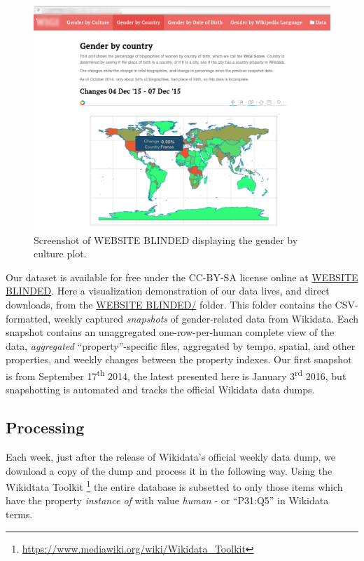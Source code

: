 \documentclass[letterpaper]{article}
\begin{document}
\begin{figure}
\label{fig:screenshot}
\includegraphics[scale=0.2]{figures/website_screenshot.png} 
\caption{Screenshot of WEBSITE BLINDED displaying the gender by culture plot.}
\end{figure}

Our dataset is available for free under the CC-BY-SA license online at  \url{WEBSITE BLINDED}. Here a visualization demonstration of our data lives, and direct downloads, from the \url{WEBSITE BLINDED/} folder. 	This folder contains the CSV-formatted, weekly captured \textit{snapshots} of gender-related data from Wikidata. Each snapshot contains an unaggregated one-row-per-human complete view of the data, \textit{aggregated} ``property''-specific files, aggregated by tempo, spatial, and other properties, and weekly changes between the property indexes. Our first snapshot is from September 17\textsuperscript{th} 2014, the latest presented here is January 3\textsuperscript{rd} 2016, but snapshotting is automated and tracks the official Wikidata data dumps.

\subsection{Processing}
Each week, just after the release of Wikidata's official weekly data dump, we download a copy of the dump and process it in the following way. Using the Wikidtata Toolkit \footnote{\url{https://www.mediawiki.org/wiki/Wikidata_Toolkit}} the entire database is subsetted to only those items which have the property \textit{instance of} with value \textit{human} - or ``P31:Q5'' in Wikidata terms.
\end{document}
